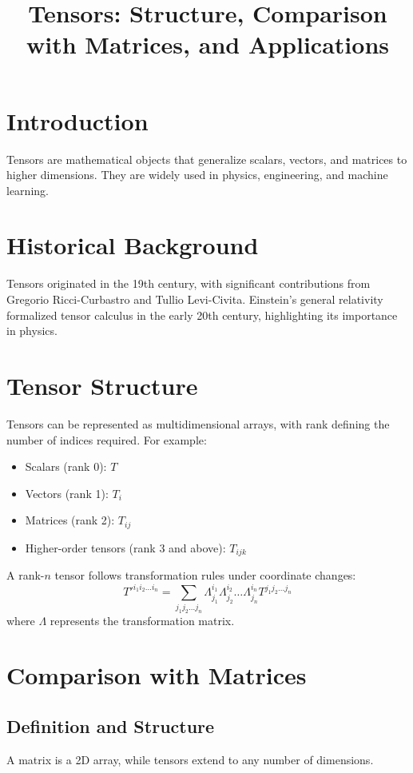 \documentclass[a4paper,12pt]{article}
\title{Tensors: Structure, Comparison with Matrices, and Applications}
\author{}
\date{}
\begin{document}
	
	\maketitle
	
	\tableofcontents
	
	\section{Introduction}
	Tensors are mathematical objects that generalize scalars, vectors, and matrices to higher dimensions. They are widely used in physics, engineering, and machine learning.
	
	\section{Historical Background}
	Tensors originated in the 19th century, with significant contributions from Gregorio Ricci-Curbastro and Tullio Levi-Civita. Einstein's general relativity formalized tensor calculus in the early 20th century, highlighting its importance in physics.
	
	\section{Tensor Structure}
	Tensors can be represented as multidimensional arrays, with rank defining the number of indices required. For example:
	\begin{itemize}
		\item Scalars (rank 0): $T$
		\item Vectors (rank 1): $T_i$
		\item Matrices (rank 2): $T_{ij}$
		\item Higher-order tensors (rank 3 and above): $T_{ijk}$
	\end{itemize}
	A rank-$n$ tensor follows transformation rules under coordinate changes:
	\begin{equation}
		T'^{i_1 i_2 \dots i_n} = \sum_{j_1 j_2 \dots j_n} \Lambda^{i_1}_{j_1} \Lambda^{i_2}_{j_2} \dots \Lambda^{i_n}_{j_n} T^{j_1 j_2 \dots j_n}
	\end{equation}
	where $\Lambda$ represents the transformation matrix.

	
	\section{Comparison with Matrices}
	\subsection{Definition and Structure}
	A matrix is a 2D array, while tensors extend to any number of dimensions.
	
\end{document}
